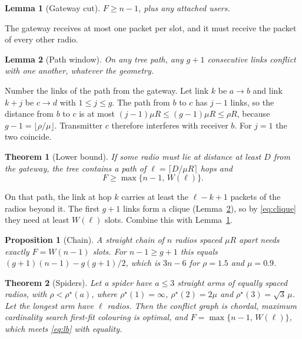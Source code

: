 \documentclass[conference]{IEEEtran}
\newtheorem{lemma}{Lemma}
\newtheorem{theorem}{Theorem}
\newtheorem{proposition}{Proposition}
\begin{document}
\begin{lemma}[Gateway cut]\label{lem:cut}
$F\ge n-1$, plus any attached users.
\end{lemma}
\begin{IEEEproof}
The gateway receives at most one packet per slot, and it must receive the packet of every other radio.
\end{IEEEproof}
\begin{lemma}[Path window]\label{lem:window}
On any tree path, any $g+1$ consecutive links conflict with one another, whatever the geometry.
\end{lemma}
\begin{IEEEproof}
Number the links of the path from the gateway. Let link $k$ be $a\to b$ and link $k+j$ be $c\to d$ with $1\le j\le g$. The path from $b$ to $c$ has $j-1$ links, so the distance from $b$ to $c$ is at most $(j-1)\mu R\le(g-1)\mu R\le\rho R$, because $g-1=\lfloor\rho/\mu\rfloor$. Transmitter $c$ therefore interferes with receiver $b$. For $j=1$ the two coincide.
\end{IEEEproof}
\begin{theorem}[Lower bound]\label{thm:lb}
If some radio must lie at distance at least $D$ from the gateway, the tree contains a path of $\ell=\lceil D/\mu R\rceil$ hops and
\begin{equation}
F\ge\max\{n-1,\,W(\ell)\}.
\label{eq:lb}
\end{equation}
\end{theorem}
\begin{IEEEproof}
On that path, the link at hop $k$ carries at least the $\ell-k+1$ packets of the radios beyond it. The first $g+1$ links form a clique (Lemma~\ref{lem:window}), so by \eqref{eq:clique} they need at least $W(\ell)$ slots. Combine this with Lemma~\ref{lem:cut}.
\end{IEEEproof}
\begin{proposition}[Chain]\label{prop:chain}
A straight chain of $n$ radios spaced $\mu R$ apart needs exactly $F=W(n-1)$ slots. For $n-1\ge g+1$ this equals $(g+1)(n-1)-g(g+1)/2$, which is $3n-6$ for $\rho=1.5$ and $\mu=0.9$.
\end{proposition}
\begin{theorem}[Spiders]\label{thm:spider}
Let a spider have $a\le 3$ straight arms of equally spaced radios, with $\rho<\rho^\star(a)$, where $\rho^\star(1)=\infty$, $\rho^\star(2)=2\mu$ and $\rho^\star(3)=\sqrt3\,\mu$. Let the longest arm have $\ell$ radios. Then the conflict graph is chordal, maximum cardinality search first-fit colouring is optimal, and $F=\max\{n-1,\,W(\ell)\}$, which meets \eqref{eq:lb} with equality.
\end{theorem}
\end{document}
